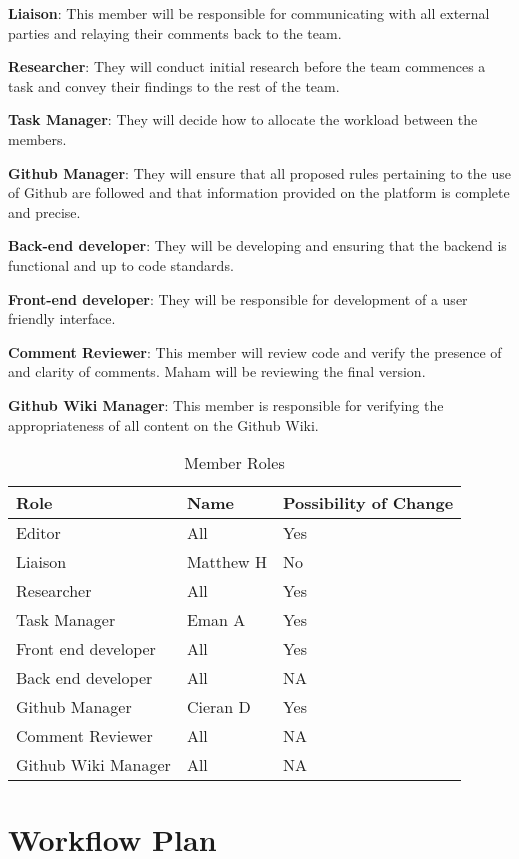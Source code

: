 \documentclass{article}
\begin{document}
\textbf{Liaison}: This member will be responsible for communicating with all external parties and relaying their comments back to the team.

\textbf{Researcher}: They will conduct initial research before the team commences a task and convey their findings to the rest of the team.

\textbf{Task Manager}: They will decide how to allocate the workload between the members.

\textbf{Github Manager}: They will ensure that all proposed rules pertaining to the use of Github are followed and that information provided on the platform is complete and precise.

\textbf{Back-end developer}: They will be developing and ensuring that the backend is functional and up to code standards.

\textbf{Front-end developer}: They will be responsible for development of a user friendly interface.

\textbf{Comment Reviewer}: This member will review code and verify the presence of and clarity of comments. Maham will be reviewing the final version.

\textbf{Github Wiki Manager}: This member is responsible for verifying the appropriateness of all content on the Github Wiki.

\begin{table}[hp]
\caption{Member Roles} \label{Proposed Assignments}
\begin{tabularx}{\textwidth}{llX}
\toprule
\textbf{Role} & \textbf{Name} & \textbf{Possibility of Change}\\
\midrule
Editor & All & Yes\\
Liaison & Matthew H  & No\\
Researcher & All & Yes \\
Task Manager & Eman A & Yes \\
Front end developer & All & Yes \\
Back end developer & All & NA \\
Github Manager & Cieran D & Yes \\
Comment Reviewer & All & NA \\
Github Wiki Manager & All & NA \\
\bottomrule
\end{tabularx}
\end{table}



\section{Workflow Plan}
\end{document}
